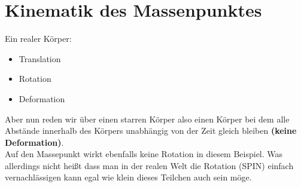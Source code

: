 \documentclass[11pt]{article}
\begin{document}
\section{Kinematik des Massenpunktes}
 	Ein realer Körper:
 	\begin{itemize}
 		\item Translation
 		\item Rotation
 		\item Deformation
 	\end{itemize}
 Aber nun reden wir über einen starren Körper also einen Körper bei dem alle Abstände innerhalb des Körpers unabhängig von der Zeit gleich bleiben \textbf{(keine Deformation)}.\\
 Auf den Massepunkt wirkt ebenfalls keine Rotation in diesem Beispiel. Was allerdings nicht heißt dass man in der realen Welt die Rotation (SPIN) einfach vernachlässigen kann egal wie klein dieses Teilchen auch sein möge.\\
\end{document}
